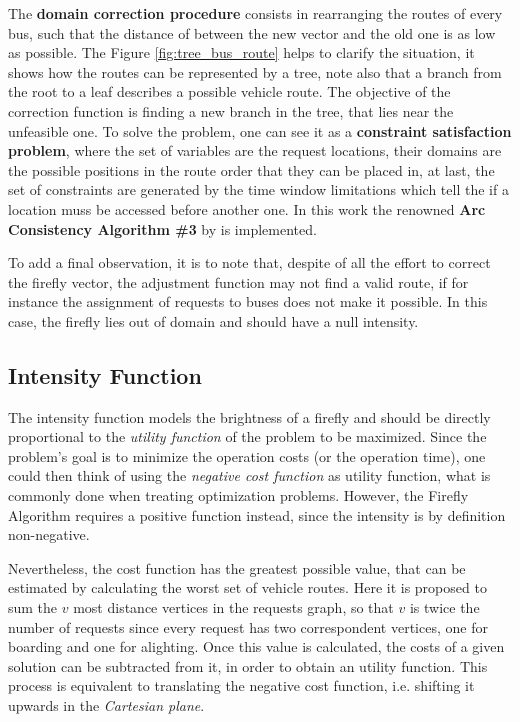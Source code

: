 \documentclass[tuberlin,cic,tc,openright,english,noabntcite,oneside]{iiufrgs}
\begin{document}
The \textbf{domain correction procedure} consists in rearranging the routes of every bus, such that the distance of between the new vector and the old one is as low as possible. The Figure \ref{fig:tree_bus_route} helps to clarify the situation, it shows how the routes can be represented by a tree, note also that a branch from the root to a leaf describes a possible vehicle route. The objective of the correction function is finding a new branch in the tree, that lies near the unfeasible one. To solve the problem, one can see it as a \textbf{constraint satisfaction problem}, where the set of variables are the request locations, their domains are the possible positions in the route order that they can be placed in, at last, the set of constraints are generated by the time window limitations which tell the if a location muss be accessed before another one. In this work the renowned \textbf{Arc Consistency Algorithm \#3} by \textcite{mackworth_consistency_1977} is implemented.

To add a final observation, it is to note that, despite of all the effort to correct the firefly vector, the adjustment function may not find a valid route, if for instance the assignment of requests to buses does not make it possible. In this case, the firefly lies out of domain and should have a null intensity.

\subsection{Intensity Function}
The intensity function models the brightness of a firefly and should be directly proportional to the \emph{utility function} of the problem to be maximized. Since the problem's goal is to minimize the operation costs (or the operation time), one could then think of using the \emph{negative cost function} as utility function, what is commonly done when treating optimization problems. However, the Firefly Algorithm requires a positive function instead, since the intensity is by definition non-negative.

Nevertheless, the cost function has the greatest possible value, that can be estimated by calculating the worst set of vehicle routes. Here it is proposed to sum the $v$ most distance vertices in the requests graph, so that $v$ is twice the number of requests since every request has two correspondent vertices, one for boarding and one for alighting. Once this value is calculated, the costs of a given solution can be subtracted from it, in order to obtain an utility function. This process is equivalent to translating the negative cost function, i.e. shifting it upwards in the \emph{Cartesian plane}.
\end{document}
